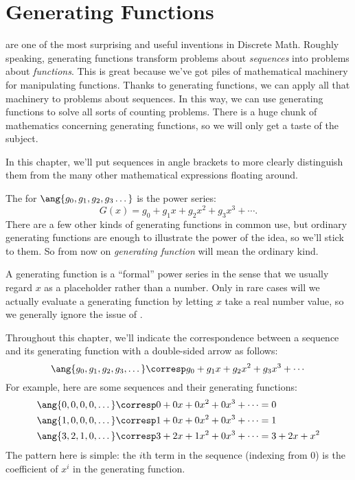 \chapter{Generating Functions}\label{generating_function_chap}

 are one of the most surprising and useful
inventions in Discrete Math.  Roughly speaking, generating functions
transform problems about \emph{sequences} into problems about
\emph{functions}.  This is great because we've got piles of mathematical
machinery for manipulating functions.  Thanks to generating functions, we
can apply all that machinery to problems about sequences.  In this way, we
can use generating functions to solve all sorts of counting problems.
There is a huge chunk of mathematics concerning generating functions, so
we will only get a taste of the subject.

In this chapter, we'll put sequences in angle brackets to more clearly
distinguish them from the many other mathematical expressions floating
around.

The  for $\ang{g_0, g_1, g_2, g_3
  \dots}$ is the power series:
\[
G(x) = g_0 + g_1 x + g_2 x^2 + g_3 x^3 + \cdots.
\]
There are a few other kinds of generating functions in common use,
but ordinary generating functions are enough to illustrate the power of
the idea, so we'll stick to them.  So from now on \emph{generating
  function} will mean the ordinary kind.

A generating function is a ``formal'' power series in the sense that we
usually regard $x$ as a placeholder rather than a number.  Only in rare
cases will we actually evaluate a generating function by letting $x$ take
a real number value, so we generally ignore the issue of .

Throughout this chapter, we'll indicate the correspondence between a
sequence and its generating function with a double-sided arrow as
follows:
%
\[
\ang{g_0, g_1, g_2, g_3, \dots}
    \corresp g_0 + g_1 x + g_2 x^2 + g_3 x^3 + \cdots
\]
%
For example, here are some sequences and their generating functions:
%
\begin{align*}
\ang{0, 0, 0, 0, \dots}
    & \corresp 0 + 0 x + 0 x^2 + 0 x^3 + \cdots = 0 \\
\ang{1, 0, 0, 0, \dots}
    & \corresp 1 + 0 x + 0 x^2 + 0 x^3 + \cdots = 1 \\
\ang{3, 2, 1, 0, \dots}
    & \corresp 3 + 2 x + 1 x^2 + 0 x^3 + \cdots = 3 + 2 x + x^2
\end{align*}
%
The pattern here is simple: the $i$th term in the sequence (indexing
from 0) is the coefficient of $x^i$ in the generating function.

